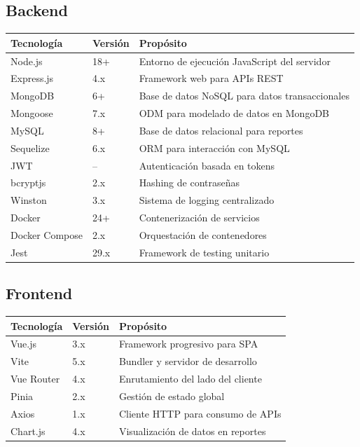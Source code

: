 \documentclass[12pt,a4paper]{article}
\begin{document}
\subsection{Backend}
\begin{table}[H]
\centering
\begin{tabularx}{\textwidth}{llX}
\toprule
\textbf{Tecnolog\'ia} & \textbf{Versi\'on} & \textbf{Prop\'osito} \\
\midrule
Node.js & 18+ & Entorno de ejecuci\'on JavaScript del servidor \\
Express.js & 4.x & Framework web para APIs REST \\
MongoDB & 6+ & Base de datos NoSQL para datos transaccionales \\
Mongoose & 7.x & ODM para modelado de datos en MongoDB \\
MySQL & 8+ & Base de datos relacional para reportes \\
Sequelize & 6.x & ORM para interacci\'on con MySQL \\
JWT & -- & Autenticaci\'on basada en tokens \\
bcryptjs & 2.x & Hashing de contrase\~nas \\
Winston & 3.x & Sistema de logging centralizado \\
Docker & 24+ & Contenerizaci\'on de servicios \\
Docker Compose & 2.x & Orquestaci\'on de contenedores \\
Jest & 29.x & Framework de testing unitario \\
\bottomrule
\end{tabularx}
\end{table}

\subsection{Frontend}
\begin{table}[H]
\centering
\begin{tabularx}{\textwidth}{llX}
\toprule
\textbf{Tecnolog\'ia} & \textbf{Versi\'on} & \textbf{Prop\'osito} \\
\midrule
Vue.js & 3.x & Framework progresivo para SPA \\
Vite & 5.x & Bundler y servidor de desarrollo \\
Vue Router & 4.x & Enrutamiento del lado del cliente \\
Pinia & 2.x & Gesti\'on de estado global \\
Axios & 1.x & Cliente HTTP para consumo de APIs \\
Chart.js & 4.x & Visualizaci\'on de datos en reportes \\
\bottomrule
\end{tabularx}
\end{table}
\end{document}
